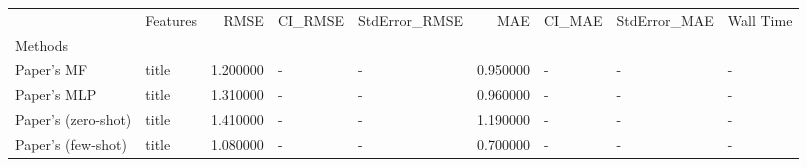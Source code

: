 \begin{tabular}{llrllrlll}
 & Features & RMSE & CI_RMSE & StdError_RMSE & MAE & CI_MAE & StdError_MAE & Wall Time \\
Methods &  &  &  &  &  &  &  &  \\
Paper's MF & title & 1.200000 & - & - & 0.950000 & - & - & - \\
Paper's MLP & title & 1.310000 & - & - & 0.960000 & - & - & - \\
Paper's (zero-shot) & title & 1.410000 & - & - & 1.190000 & - & - & - \\
Paper's (few-shot) & title & 1.080000 & - & - & 0.700000 & - & - & - \\
\end{tabular}
